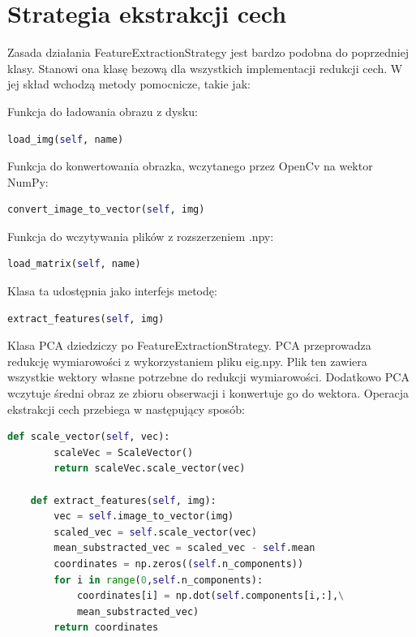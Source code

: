 \documentclass[oneside, eng]{mgr}
\begin{document}
\section{Strategia ekstrakcji cech}

Zasada działania FeatureExtractionStrategy jest bardzo podobna do poprzedniej klasy. Stanowi ona klasę bezową dla wszystkich implementacji redukcji cech. W jej skład wchodzą metody pomocnicze, takie jak:

Funkcja do ładowania obrazu z dysku:

\begin{lstlisting}[language=Python]
	load_img(self, name)
\end{lstlisting}

Funkcja do konwertowania obrazka, wczytanego przez OpenCv na wektor NumPy:

\begin{lstlisting}[language=Python]
	convert_image_to_vector(self, img)
\end{lstlisting}

Funkcja do wczytywania plików z rozszerzeniem .npy: 
	
\begin{lstlisting}[language=Python]
	load_matrix(self, name)
\end{lstlisting}

Klasa ta udostępnia jako interfejs metodę:

\begin{lstlisting}[language=Python]
	extract_features(self, img)
\end{lstlisting}

Klasa PCA dziedziczy po FeatureExtractionStrategy. PCA przeprowadza redukcję wymiarowości z wykorzystaniem pliku eig.npy. Plik ten zawiera wszystkie wektory własne potrzebne do redukcji wymiarowości. Dodatkowo PCA wczytuje średni obraz ze zbioru obserwacji i konwertuje go do wektora. Operacja ekstrakcji cech przebiega w następujący sposób:

\begin{lstlisting}[language=Python]
    def scale_vector(self, vec):
        scaleVec = ScaleVector()
        return scaleVec.scale_vector(vec)

    def extract_features(self, img):
        vec = self.image_to_vector(img)
        scaled_vec = self.scale_vector(vec)
        mean_substracted_vec = scaled_vec - self.mean
        coordinates = np.zeros((self.n_components))
        for i in range(0,self.n_components):
            coordinates[i] = np.dot(self.components[i,:],\
            mean_substracted_vec)
        return coordinates
\end{lstlisting}
\end{document}
